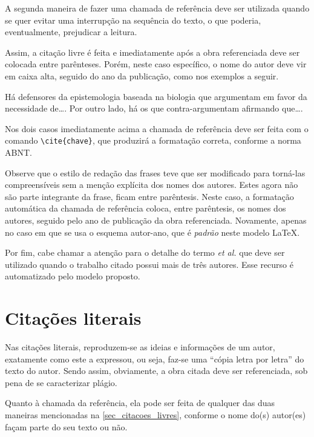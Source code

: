 \begin{apendicesenv}
    A segunda maneira de fazer uma chamada de referência deve ser utilizada quando se quer evitar uma interrupção na sequência do texto, o que poderia, eventualmente, prejudicar a leitura.

    \newpage

    Assim, a citação livre é feita e imediatamente após a obra referenciada deve ser colocada entre parênteses.
    Porém, neste caso específico, o nome do autor deve vir em caixa alta, seguido do ano da publicação, como nos exemplos a seguir.

    Há defensores da epistemologia baseada na biologia que argumentam em favor da necessidade de\ldots \cite{Maturana2003}.
    Por outro lado, há os que contra-argumentam afirmando que\ldots  \cite{nunes2017local}.

    Nos dois casos imediatamente acima a chamada de referência deve ser feita com o comando \verb|\cite{chave}|, que produzirá a formatação correta, conforme a norma ABNT.

    Observe que o estilo de redação das frases teve que ser modificado para torná-las compreensíveis sem a menção explícita dos nomes dos autores.
    Estes agora não são parte integrante da frase, ficam entre parêntesis.
    Neste caso, a formatação automática da chamada de referência coloca, entre parêntesis, os nomes dos autores, seguido pelo ano de publicação da obra referenciada.
    Novamente, apenas no caso em que se usa o esquema autor-ano, que é \textit{padrão} neste modelo \LaTeX{}.

    Por fim, cabe chamar a atenção para o detalhe do termo \textit{et al.} que deve ser utilizado quando o trabalho citado possui mais de três autores.
    Esse recurso é automatizado pelo modelo proposto.

    \section{Citações literais}
    \label{sec_citacoes_literais}

    Nas citações literais, reproduzem-se as ideias e informações de um autor, exatamente como este a expressou, ou seja, faz-se uma ``cópia letra por letra'' do texto do autor.
    Sendo assim, obviamente, a obra citada deve ser referenciada, sob pena de se caracterizar plágio.

    Quanto à chamada da referência, ela pode ser feita de qualquer das duas maneiras mencionadas na \autoref{sec_citacoes_livres}, conforme o nome do(s) autor(es) façam parte do seu texto ou não.


\end{apendicesenv}
